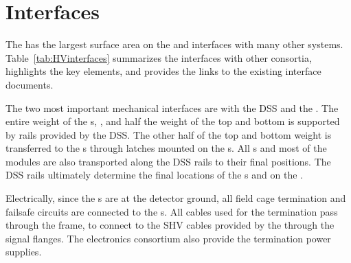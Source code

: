 \section{Interfaces }
\label{sec:fdsp-hv-intfc}




The  has the largest surface area on the  and interfaces with many other systems.  Table~\ref{tab:HVinterfaces} summarizes the interfaces with other consortia, highlights the key elements, and provides the links to the existing interface documents.

The two most important mechanical interfaces are with the DSS and the .  The entire weight of the s, ,  and half the weight of the top and bottom  is supported by rails provided by the DSS.  The other half of the top and bottom  weight is transferred to the s through latches mounted on the s. All s and most of the  modules are also transported along the DSS rails to their final positions. The DSS rails ultimately determine the final locations of the s and  on the .

Electrically, since the s are at the detector ground, all  field cage termination and failsafe circuits are connected to the s.  All cables used for the  termination pass through the  frame, to connect to the SHV cables provided by the  through the  signal flanges.  The  electronics consortium also provide  the  termination power supplies.




